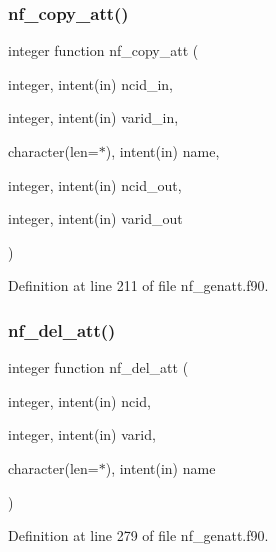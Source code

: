 \subsubsection{\texorpdfstring{nf\+\_\+copy\+\_\+att()}{nf\_copy\_att()}}
{\footnotesize\ttfamily integer function nf\+\_\+copy\+\_\+att (\begin{DoxyParamCaption}\item[{integer, intent(in)}]{ncid\+\_\+in,  }\item[{integer, intent(in)}]{varid\+\_\+in,  }\item[{character(len=$\ast$), intent(in)}]{name,  }\item[{integer, intent(in)}]{ncid\+\_\+out,  }\item[{integer, intent(in)}]{varid\+\_\+out }\end{DoxyParamCaption})}



Definition at line 211 of file nf\+\_\+genatt.\+f90.

\mbox{\label{nf__genatt_8f90_aac4a8c722320d4d7b0115094ce88db0a}} 
\subsubsection{\texorpdfstring{nf\+\_\+del\+\_\+att()}{nf\_del\_att()}}
{\footnotesize\ttfamily integer function nf\+\_\+del\+\_\+att (\begin{DoxyParamCaption}\item[{integer, intent(in)}]{ncid,  }\item[{integer, intent(in)}]{varid,  }\item[{character(len=$\ast$), intent(in)}]{name }\end{DoxyParamCaption})}



Definition at line 279 of file nf\+\_\+genatt.\+f90.

\mbox{\label{nf__genatt_8f90_a56295cef3f86600abb03037771418c4a}} 
